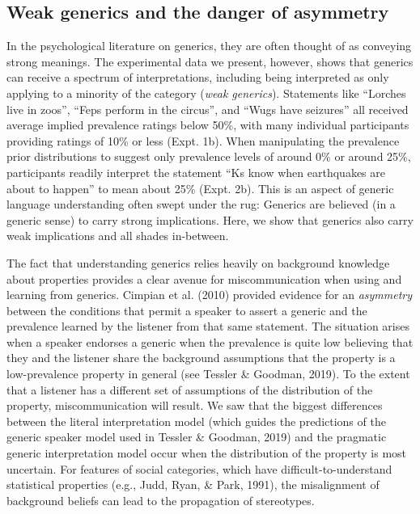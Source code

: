 \documentclass[floatsintext,doc]{apa6}
\begin{document}
\subsection{Weak generics and the danger of asymmetry}

In the psychological literature on generics, they are often thought of as conveying strong meanings.
The experimental data we present, however, shows that generics can receive a spectrum of interpretations, including being interpreted as only applying to a minority of the category (\emph{weak generics}). 
Statements like \enquote{Lorches live in zoos}, \enquote{Feps perform in the circus}, and \enquote{Wugs have seizures} all received average implied prevalence ratings below 50\%, with many individual participants providing ratings of 10\% or less (Expt. 1b).
When manipulating the prevalence prior distributions to suggest only prevalence levels of around 0\% or around 25\%, participants readily interpret the statement \enquote{Ks know when earthquakes are about to happen} to mean about 25\% (Expt. 2b).
This is an aspect of generic language understanding often swept under the rug: Generics are believed (in a generic sense) to carry strong implications.
Here, we show that generics also carry weak implications and all shades in-between.

The fact that understanding generics relies heavily on background knowledge about properties provides a clear avenue for miscommunication when using and learning from generics.
Cimpian et al. (2010) provided evidence for an \emph{asymmetry} between the conditions that permit a speaker to assert a generic and the prevalence learned by the listener from that same statement. 
The situation arises when a speaker endorses a generic when the prevalence is quite low believing that they and the listener share the background assumptions that the property is a low-prevalence property in general (see Tessler \& Goodman, 2019).
To the extent that a listener has a different set of assumptions of the distribution of the property, miscommunication will result.
We saw that the biggest differences between the literal interpretation model (which guides the predictions of the generic speaker model used in Tessler \& Goodman, 2019) and the pragmatic generic interpretation model occur when the distribution of the property is most uncertain.
For features of social categories, which have difficult-to-understand statistical properties (e.g., Judd, Ryan, \& Park, 1991), the misalignment of background beliefs can lead to the propagation of stereotypes.
\end{document}
